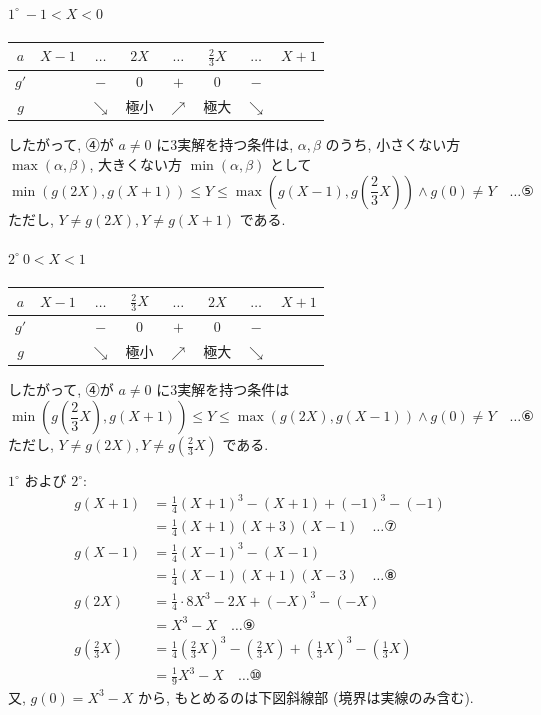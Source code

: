 \documentclass[../main.tex]{subfiles}
\begin{document}
\paragraph{$1^\circ \ -1 < X < 0$}

\begin{center}
  \begin{tabular}{c|c|c|c|c|c|c|c}
    $a$ & $X-1$ & $\dots$ & $2X$ & $\dots$ & $\frac{2}{3}X$ & $\dots$ & $X+1$ \\ \hline
    $g'$ & & $-$ & $0$ & $+$ & $0$ & $-$ & \\ \hline
    $g$ & & $\searrow$ & 極小 & $\nearrow$ & 極大 & $\searrow$ &
  \end{tabular}
\end{center}

したがって, ④が $a \ne 0$ に3実解を持つ条件は, $\alpha, \beta$ のうち, 小さくない方 $\max(\alpha,\beta)$, 大きくない方 $\min(\alpha,\beta)$ として
\[
  \min\left(g(2X), g(X+1)\right) \le Y \le \max\left(g(X-1), g\left(\frac{2}{3}X\right)\right) \land g(0) \ne Y \quad \dots \text{⑤}
\]
ただし, $Y \ne g(2X), Y \ne g(X+1)$ である.

\paragraph{$2^\circ \ 0 < X < 1$}

\begin{center}
  \begin{tabular}{c|c|c|c|c|c|c|c}
    $a$ & $X-1$ & $\dots$ & $\frac{2}{3}X$ & $\dots$ & $2X$ & $\dots$ & $X+1$ \\ \hline
    $g'$ & & $-$ & $0$ & $+$ & $0$ & $-$ & \\ \hline
    $g$ & & $\searrow$ & 極小 & $\nearrow$ & 極大 & $\searrow$ &
  \end{tabular}
\end{center}

したがって, ④が $a \ne 0$ に3実解を持つ条件は
\[
  \min\left(g\left(\frac{2}{3}X\right), g(X+1)\right) \le Y \le \max\left(g(2X), g(X-1)\right) \land g(0) \ne Y \quad \dots \text{⑥}
\]
ただし, $Y \ne g(2X), Y \ne g\left(\frac{2}{3}X\right)$ である.

$1^\circ$ および $2^\circ$:
\begin{align*}
  g(X+1) &= \frac{1}{4}(X+1)^3 - (X+1) + (-1)^3 - (-1) \\
  &= \frac{1}{4}(X+1)(X+3)(X-1) \quad \dots \text{⑦} \\
  g(X-1) &= \frac{1}{4}(X-1)^3 - (X-1) \\
  &= \frac{1}{4}(X-1)(X+1)(X-3) \quad \dots \text{⑧} \\
  g(2X) &= \frac{1}{4} \cdot 8 X^3 - 2X + (-X)^3 - (-X) \\
  &= X^3 - X \quad \dots \text{⑨} \\
  g\left(\frac{2}{3}X\right) &= \frac{1}{4}\left(\frac{2}{3}X\right)^3 - \left(\frac{2}{3}X\right) + \left(\frac{1}{3}X\right)^3 - \left(\frac{1}{3}X\right) \\
  &= \frac{1}{9}X^3 - X \quad \dots \text{⑩}
\end{align*}
又, $g(0) = X^3 - X$ から, もとめるのは下図斜線部 (境界は実線のみ含む).
\end{document}
